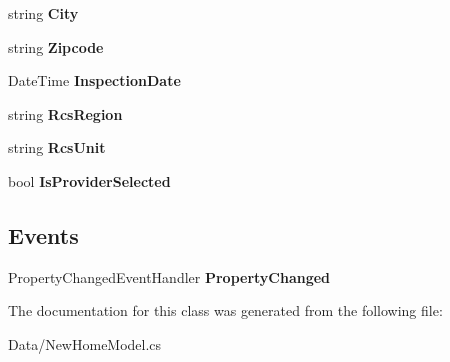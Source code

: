 \begin{DoxyCompactItemize}
\item 
\mbox{\label{class_a_f_h___scheduler_1_1_data_1_1_new_home_model_a8398ec0b646046b3ac544136897c6b20}} 
string {\bfseries City}\hspace{0.3cm}{\ttfamily  [get, set]}
\item 
\mbox{\label{class_a_f_h___scheduler_1_1_data_1_1_new_home_model_a4eee661d68a0ed18b726e71305b67d50}} 
string {\bfseries Zipcode}\hspace{0.3cm}{\ttfamily  [get, set]}
\item 
\mbox{\label{class_a_f_h___scheduler_1_1_data_1_1_new_home_model_a2cf786cc51058ecc0f2b99b612c9a716}} 
Date\+Time {\bfseries Inspection\+Date}\hspace{0.3cm}{\ttfamily  [get, set]}
\item 
\mbox{\label{class_a_f_h___scheduler_1_1_data_1_1_new_home_model_a670902f08dff6a71b9c7bcc06da9e254}} 
string {\bfseries Rcs\+Region}\hspace{0.3cm}{\ttfamily  [get, set]}
\item 
\mbox{\label{class_a_f_h___scheduler_1_1_data_1_1_new_home_model_a80300bd8c1057fb469bd1f6f57c14257}} 
string {\bfseries Rcs\+Unit}\hspace{0.3cm}{\ttfamily  [get, set]}
\item 
\mbox{\label{class_a_f_h___scheduler_1_1_data_1_1_new_home_model_ac7af00024ce1af1bf05e09f2e3dcdeca}} 
bool {\bfseries Is\+Provider\+Selected}\hspace{0.3cm}{\ttfamily  [get, set]}
\end{DoxyCompactItemize}
\subsection*{Events}
\begin{DoxyCompactItemize}
\item 
\mbox{\label{class_a_f_h___scheduler_1_1_data_1_1_new_home_model_a9f837e8327884315a3d96dc6f4c0c696}} 
Property\+Changed\+Event\+Handler {\bfseries Property\+Changed}
\end{DoxyCompactItemize}


The documentation for this class was generated from the following file\+:\begin{DoxyCompactItemize}
\item 
Data/New\+Home\+Model.\+cs\end{DoxyCompactItemize}
